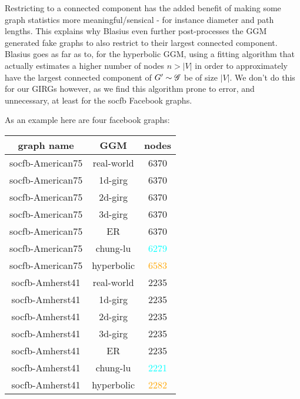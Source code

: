 Restricting to a connected component has the added benefit of making some graph statistics more meaningful/sensical - for instance diameter and path lengths. This explains why Blasius even further post-processes the GGM generated fake graphs to also restrict to their largest connected component. Blasius goes as far as to, for the hyperbolic GGM, using a fitting algorithm that actually estimates a higher number of nodes $n > |V|$ in order to approximately have the largest connected component of $G' \sim \mathscr{G}$ be of size $|V|$. We don't do this for our GIRGs however, as we find this algorithm prone to error, and unnecessary, at least for the socfb Facebook graphs.

As an example here are four facebook graphs:

\begin{table}[]
    \centering
    \begin{tabular}{|c|c|c|}
    \hline
    \textbf{graph name} & \textbf{GGM} & \textbf{nodes} \\ \hline
    socfb-American75 & real-world & 6370 \\ \hline
    socfb-American75 & 1d-girg & 6370 \\ \hline
    socfb-American75 & 2d-girg & 6370 \\ \hline
    socfb-American75 & 3d-girg & 6370 \\ \hline
    socfb-American75 & ER & 6370 \\ \hline
    socfb-American75 & chung-lu & \textcolor{cyan}{6279} \\ \hline
    socfb-American75 & hyperbolic & \textcolor{orange}{6583} \\ \hline
    
    socfb-Amherst41 & real-world & 2235 \\ \hline
    socfb-Amherst41 & 1d-girg & 2235 \\ \hline
    socfb-Amherst41 & 2d-girg & 2235 \\ \hline
    socfb-Amherst41 & 3d-girg & 2235 \\ \hline
    socfb-Amherst41 & ER & 2235 \\ \hline
    socfb-Amherst41 & chung-lu & \textcolor{cyan}{2221} \\ \hline
    socfb-Amherst41 & hyperbolic & \textcolor{orange}{2282} \\ \hline


\end{tabular}
\end{table}
